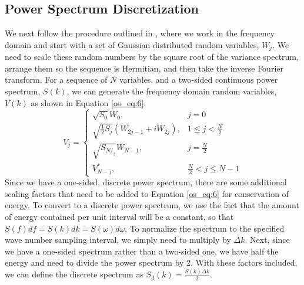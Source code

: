 \subsection{Power Spectrum Discretization}
We next follow the procedure outlined in \cite{percival_spectra},  where we work in the frequency domain and start with a set of Gaussian distributed random variables, $W_j$. We need to scale these random numbers by the square root of the variance spectrum, arrange them so the sequence is Hermitian, and then take the inverse Fourier transform. For a sequence of $N$ variables, and a two-sided continuous power spectrum, $S(k)$, we can generate the frequency domain random variables, $V(k)$ as shown in Equation \ref{os_eq:6}.
\begin{equation}
  \label{os_eq:6}   
  V_j = \begin{cases}
    \sqrt{S_0}W_0, & j = 0 \\
    \sqrt{\frac{1}{2}S_j}\left(W_{2j-1} + iW_{2j} \right), & 1 \leq j <\frac{N}{2} \\
    \sqrt{S_{N/_2}}W_{N-1}, & j = \frac{N}{2} \\
    V_{N-j}^*, &  \frac{N}{2} < j \leq N-1 
  \end{cases} 
\end{equation}
Since we have a one-sided, discrete power spectrum, there are some additional scaling factors that need to be added to Equation \ref{os_eq:6} for conservation of energy. To convert to a discrete power spectrum, we use the fact that the amount of energy contained per unit interval will be a constant, so that $S(f)df = S(k)dk = S(\omega) d\omega$. To normalize the spectrum to the specified wave number sampling interval, we simply need to multiply by $\Delta k$. Next, since we have a one-sided spectrum rather than a two-sided one, we have half the energy and need to divide the power spectrum by 2. With these factors included, we can define the discrete spectrum as $S_d(k) = \frac{S(k)\Delta k}{2}$.

